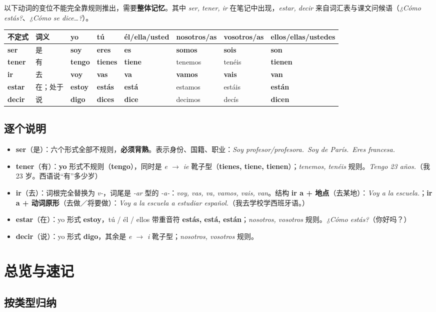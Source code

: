 \documentclass[a4paper,11pt]{ctexart}
\makeatletter
\newcommand{\ir}[1]{\textbf{\textcolor{accent}{#1}}}
\newcommand{\es}[1]{\textit{#1}}
\newcommand{\conj}[8]{\textbf{#1} & {\small #2} & #3 & #4 & #5 & #6 & #7 & #8 \\}
\newenvironment{conjtable}{%
  \par\small\setlength{\tabcolsep}{3.5pt}
  \begin{tabular}{@{}>{\raggedright\arraybackslash}p{1.95cm}>{\raggedright\arraybackslash}p{1.6cm}%
    >{\raggedright\arraybackslash}p{1.75cm}>{\raggedright\arraybackslash}p{1.75cm}>{\raggedright\arraybackslash}p{1.95cm}%
    >{\raggedright\arraybackslash}p{2.15cm}>{\raggedright\arraybackslash}p{1.95cm}>{\raggedright\arraybackslash}p{2.1cm}@{}}
  \toprule
  \textbf{不定式} & \textbf{词义} & \textbf{yo} & \textbf{tú} & \textbf{él/ella/\newline usted} & \textbf{nosotros/as} & \textbf{vosotros/as} & \textbf{ellos/ellas/\newline ustedes} \\
  \midrule
}{%
  \bottomrule\end{tabular}\par\normalsize
}
\makeatother
\begin{document}
以下动词的变位不能完全靠规则推出，需要\textbf{整体记忆}。其中 \es{ser, tener, ir} 在笔记中出现，\es{estar, decir} 来自词汇表与课文问候语（\es{¿Cómo estás?}、\es{¿Cómo se dice\ldots?}）。

\begin{conjtable}
\conj{ser}{是}{\ir{soy}}{\ir{eres}}{\ir{es}}{\ir{somos}}{\ir{sois}}{\ir{son}}
\conj{tener}{有}{\ir{tengo}}{\ir{tienes}}{\ir{tiene}}{tenemos}{tenéis}{\ir{tienen}}
\conj{ir}{去}{\ir{voy}}{\ir{vas}}{\ir{va}}{\ir{vamos}}{\ir{vais}}{\ir{van}}
\conj{estar}{在；处于}{\ir{estoy}}{\ir{estás}}{\ir{está}}{estamos}{estáis}{\ir{están}}
\conj{decir}{说}{\ir{digo}}{\ir{dices}}{\ir{dice}}{decimos}{decís}{\ir{dicen}}
\end{conjtable}

\subsection{逐个说明}

\begin{itemize}[leftmargin=1.4em,itemsep=3pt]
  \item \textbf{ser}（是）：六个形式全部不规则，\textbf{必须背熟}。表示身份、国籍、职业：\es{Soy profesor/profesora.}\ \es{Soy de París.}\ \es{Eres francesa.}
  \item \textbf{tener}（有）：\textbf{yo} 形式不规则（\ir{tengo}），同时是 \es{e $\to$ ie} 靴子型（\ir{tienes, tiene, tienen}）；\es{tenemos, tenéis} 规则。\es{Tengo 23 años.}（我 23 岁。西语说“有”多少岁）
  \item \textbf{ir}（去）：词根完全替换为 \es{v-}，词尾是 \es{-ar} 型的 \es{-a-}：\es{voy, vas, va, vamos, vais, van}。结构 \textbf{ir a + 地点}（去某地）：\es{Voy a la escuela.}；\textbf{ir a + 动词原形}（去做／将要做）：\es{Voy a la escuela a estudiar español.}（我去学校学西班牙语。）
  \item \textbf{estar}（在）：yo 形式 \ir{estoy}，tú / él / ellos 带重音符 \ir{estás, está, están}；\es{nosotros, vosotros} 规则。\es{¿Cómo estás?}（你好吗？）
  \item \textbf{decir}（说）：yo 形式 \ir{digo}，其余是 \es{e $\to$ i} 靴子型；\es{nosotros, vosotros} 规则。
\end{itemize}

\section{总览与速记}

\subsection{按类型归纳}
\end{document}
